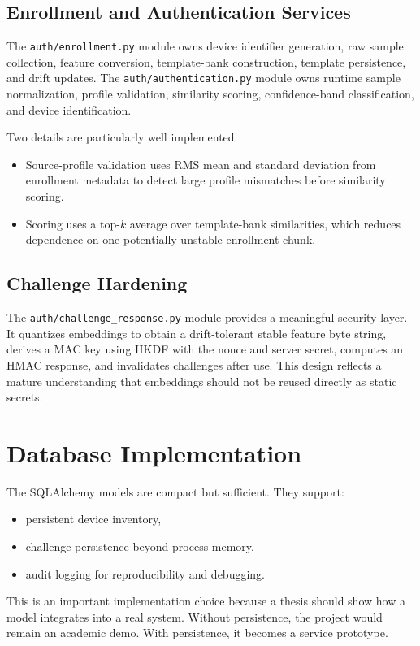\documentclass[12pt]{report}
\begin{document}
\subsection{Enrollment and Authentication Services}
The \texttt{auth/enrollment.py} module owns device identifier generation, raw sample collection, feature conversion, template-bank construction, template persistence, and drift updates. The \texttt{auth/authentication.py} module owns runtime sample normalization, profile validation, similarity scoring, confidence-band classification, and device identification.

Two details are particularly well implemented:
\begin{itemize}[leftmargin=1.2cm]
\item Source-profile validation uses RMS mean and standard deviation from enrollment metadata to detect large profile mismatches before similarity scoring.
\item Scoring uses a top-$k$ average over template-bank similarities, which reduces dependence on one potentially unstable enrollment chunk.
\end{itemize}

\subsection{Challenge Hardening}
The \texttt{auth/challenge\_response.py} module provides a meaningful security layer. It quantizes embeddings to obtain a drift-tolerant stable feature byte string, derives a MAC key using HKDF with the nonce and server secret, computes an HMAC response, and invalidates challenges after use. This design reflects a mature understanding that embeddings should not be reused directly as static secrets.

\section{Database Implementation}
The SQLAlchemy models are compact but sufficient. They support:
\begin{itemize}[leftmargin=1.2cm]
\item persistent device inventory,
\item challenge persistence beyond process memory,
\item audit logging for reproducibility and debugging.
\end{itemize}

This is an important implementation choice because a thesis should show how a model integrates into a real system. Without persistence, the project would remain an academic demo. With persistence, it becomes a service prototype.
\end{document}
